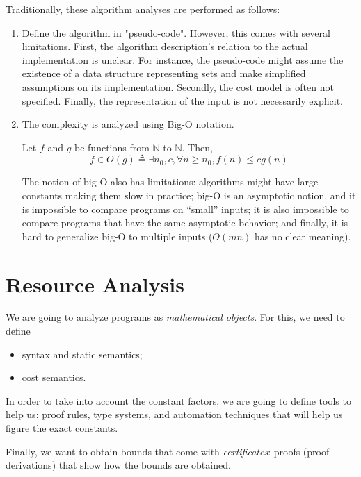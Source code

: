 \documentclass[ manuscript,screen, nonacm]{acmart}
\begin{document}
Traditionally, these algorithm analyses are performed as follows:
\begin{enumerate}
    \item Define the algorithm in "pseudo-code". However, this comes with several limitations.
    First, the algorithm description's relation to the actual implementation is unclear. 
    For instance, the
    pseudo-code might assume the existence of a data structure representing sets and make simplified assumptions
    on its implementation. 
    Secondly, the cost model is often not specified. 
    Finally, the representation of the input is not necessarily explicit.
    \item The complexity is analyzed using Big-O notation.
    \begin{definition}[Big-O]\label{def:big-o}
        Let \(f\) and \(g\) be functions from \(\mathbb{N}\) to \(\mathbb{N}\).
        Then,
        \[
          f \in O(g) \triangleq \exists n_0, c, \forall n\geq n_0, f(n) \leq c g(n)
        \]
    \end{definition}
    The notion of big-O also has limitations: algorithms might have large constants making them slow
    in practice; big-O is an asymptotic notion, and it is impossible to compare programs on ``small''
    inputs; it is also impossible to compare programs that have the same asymptotic behavior; and finally,
    it is hard to generalize big-O to multiple inputs (\(O(mn)\) has no clear meaning).
\end{enumerate}

\section{Resource Analysis}

We are going to analyze programs as \emph{mathematical objects}. For this, we need to define
\begin{itemize}
    \item syntax and static semantics;
    \item cost semantics.
\end{itemize}

In order to take into account the constant factors, we are going to define tools to help us: proof rules,
type systems, and automation techniques that will help us figure the exact constants.

Finally, we want to obtain bounds that come with \emph{certificates}: proofs (proof derivations) that
show how the bounds are obtained.
\end{document}
